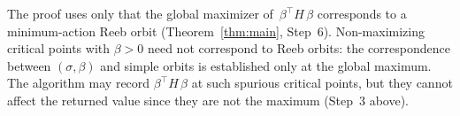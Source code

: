 \begin{remark}\label{rem:non-maximizer-warning}
The proof uses only that the global maximizer
of~$\beta^\top H\, \beta$
corresponds to a minimum-action Reeb orbit
(Theorem~\ref{thm:main}, Step~6).
Non-maximizing critical points with $\beta > 0$
need not correspond to Reeb orbits:
the correspondence between $(\sigma, \beta)$ and simple orbits
is established only at the global maximum.
The algorithm may record $\beta^\top H\, \beta$ at such
spurious critical points, but they cannot affect the
returned value since they are not the maximum
(Step~3 above).
\end{remark}
